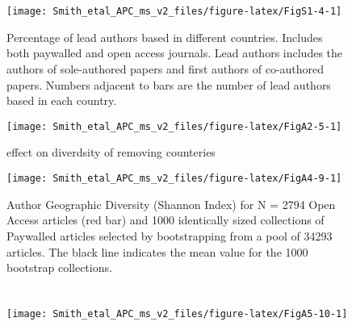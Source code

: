 \documentclass[
  english,
  man]{apa6}
\newcommand{\blandscape}{\begin{landscape}}
\newcommand{\elandscape}{\end{landscape}}
\begin{document}
\begin{appendix}
\section{}
\begin{figure}

{\centering \texttt{[image: Smith\_etal\_APC\_ms\_v2\_files/figure-latex/FigS1-4-1]} 

}

\caption{Percentage of lead authors based in different countries. Includes both paywalled and open access journals. Lead authors includes the authors of sole-authored papers and first authors of co-authored papers. Numbers adjacent to bars are the number of lead authors based in each country.}\label{fig:FigS1-4}
\end{figure}

\newpage
\blandscape
\begin{figure}

{\centering \texttt{[image: Smith\_etal\_APC\_ms\_v2\_files/figure-latex/FigA2-5-1]} 

}

\caption{effect on diverdsity of removing counteries}\label{fig:FigA2-5}
\end{figure}

\newpage

\elandscape

\newpage

\begin{figure}

{\centering \texttt{[image: Smith\_etal\_APC\_ms\_v2\_files/figure-latex/FigA4-9-1]} 

}

\caption{Author Geographic Diversity (Shannon Index) for N =  2794  Open Access articles (red bar) and 1000 identically sized collections of Paywalled articles selected by bootstrapping from a pool of  34293  articles. The black line indicates the mean value for the 1000 bootstrap collections.}\label{fig:FigA4-9}
\end{figure}

\hypertarget{section}{%
\section{}\label{section}}

\begin{figure}

{\centering \texttt{[image: Smith\_etal\_APC\_ms\_v2\_files/figure-latex/FigA5-10-1]} 

}
\end{figure}
\end{appendix}
\end{document}
